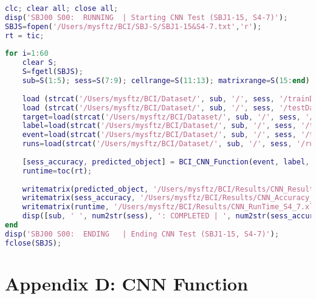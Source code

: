 \begin{lstlisting}[language=matlab]
clc; clear all; close all; 
disp('SBJ00 S00:  RUNNING  | Starting CNN Test (SBJ1-15, S4-7)');
SBJS=fopen('/Users/mysftz/BCI/SBJ-S/SBJ1-15&S4-7.txt','r');
rt = tic; 
    
for i=1:60
    clear S;
    S=fgetl(SBJS);         
    sub=S(1:5); sess=S(7:9); cellrange=S(11:13); matrixrange=S(15:end);
    
    load (strcat('/Users/mysftz/BCI/Dataset/', sub, '/', sess, '/trainData.mat'));
    load (strcat('/Users/mysftz/BCI/Dataset/', sub, '/', sess, '/testData.mat'));
    target=load(strcat('/Users/mysftz/BCI/Dataset/', sub, '/', sess, '/trainTargets.txt')); 
    label=load(strcat('/Users/mysftz/BCI/Dataset/', sub, '/', sess, '/testLabels.txt')); 
    event=load(strcat('/Users/mysftz/BCI/Dataset/', sub, '/', sess, '/testEvents.txt')); 
    runs=load(strcat('/Users/mysftz/BCI/Dataset/', sub, '/', sess, '/runs_per_block.txt'));
    
    [sess_accuracy, predicted_object] = BCI_CNN_Function(event, label, runs, sess, sub, target, testData, trainData);
    runtime=toc(rt); 
    
    writematrix(predicted_object, '/Users/mysftz/BCI/Results/CNN_Results_S4_7.xlsx', 'Range', matrixrange); 
    writematrix(sess_accuracy, '/Users/mysftz/BCI/Results/CNN_Accuracy_S4_7.xlsx', 'Range', cellrange); 
    writematrix(runtime, '/Users/mysftz/BCI/Results/CNN_RunTime_S4_7.xlsx', 'Range', cellrange); 
    disp([sub, ' ', num2str(sess), ': COMPLETED | ', num2str(sess_accuracy), '% Accuracy in ', num2str(runtime), 's']);
end
disp('SBJ00 S00:  ENDING   | Ending CNN Test (SBJ1-15, S4-7)'); 
fclose(SBJS); 
\end{lstlisting}

\newpage
\section*{Appendix D: CNN Function}
\label{Appendix D: CNN Function Section}

